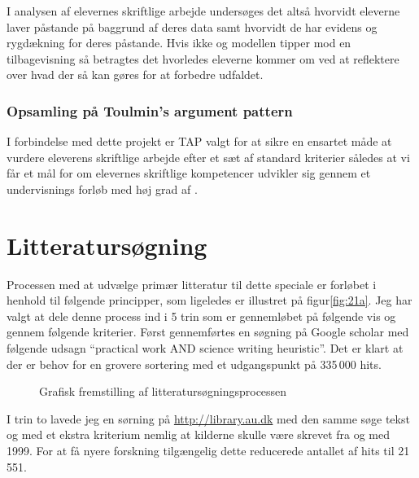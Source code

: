 I analysen af elevernes skriftlige arbejde undersøges det altså hvorvidt eleverne laver påstande på baggrund af deres data samt hvorvidt de har evidens og rygdækning for deres påstande. Hvis ikke og modellen tipper mod en tilbagevisning så betragtes det hvorledes eleverne kommer om ved at reflektere over hvad der så kan gøres for at forbedre udfaldet.

\subsubsection*{Opsamling på Toulmin's argument pattern}
I forbindelse med dette projekt er TAP valgt for at sikre en ensartet måde at vurdere eleverens skriftlige arbejde efter et sæt af standard kriterier således at vi får et mål for om elevernes skriftlige kompetencer udvikler sig gennem et undervisnings forløb med høj grad af \ib{}. 

\section{Litteratursøgning}
\label{sec:lit}

Processen med at udvælge primær litteratur til dette speciale er forløbet i henhold til følgende principper, som ligeledes er illustret på  figur\vref{fig:21a}. Jeg har valgt at dele denne process ind i 5 trin som er gennemløbet på følgende vis og gennem følgende kriterier. Først gennemførtes en søgning på Google scholar med følgende udsagn ``practical work AND science writing heuristic''. Det er klart at der er behov for en grovere sortering med et udgangspunkt på 335\,000 hits. 

\begin{figure}
	\centering
	\vspace{-10pt}
	\vspace{0pt}
	\caption[Litteratursøgningsprocessen]{Grafisk fremstilling af litteratursøgningsprocessen}
	\label{fig:21a}
	\vspace{-20pt}
\end{figure}

I trin to lavede jeg en sørning på \url{http://library.au.dk} med den samme søge tekst og med et ekstra kriterium nemlig at kilderne skulle være skrevet fra og med 1999. For at få nyere forskning tilgængelig dette reducerede antallet af hits til 21\,551. 

